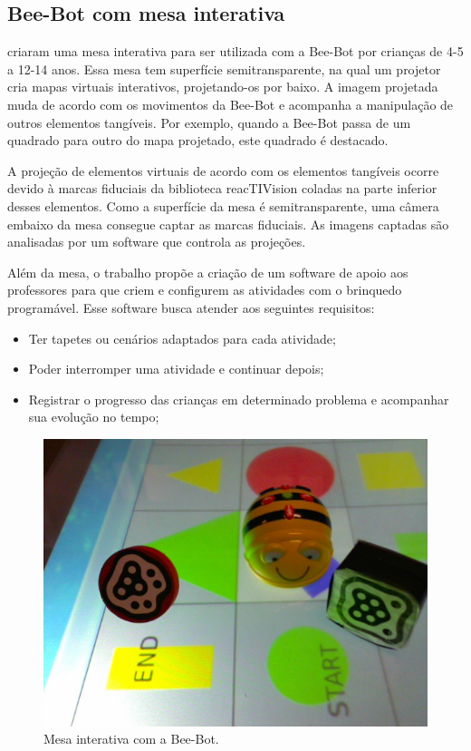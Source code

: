 \subsection{Bee-Bot com mesa interativa}
 criaram uma mesa interativa para ser utilizada com a Bee-Bot por crianças de 4-5 a 12-14 anos. Essa mesa tem superfície semitransparente, na qual um projetor cria mapas virtuais interativos, projetando-os por baixo. A imagem projetada muda de acordo com os movimentos da Bee-Bot e acompanha a manipulação de outros elementos tangíveis. Por exemplo, quando a Bee-Bot passa de um quadrado para outro do mapa projetado, este quadrado é destacado.

A projeção de elementos virtuais de acordo com os elementos tangíveis ocorre devido à marcas fiduciais da biblioteca reacTIVision coladas na parte inferior desses elementos. Como a superfície da mesa é semitransparente, uma câmera embaixo da mesa consegue captar as marcas fiduciais. As imagens captadas são analisadas por um software que controla as projeções.

Além da mesa, o trabalho propõe a criação de um software de apoio aos professores para que criem e configurem as atividades com o brinquedo programável. Esse software busca atender aos seguintes requisitos:

\begin{itemize}
    \item Ter tapetes ou cenários adaptados para cada atividade;
    \item Poder interromper uma atividade e continuar depois;
    \item Registrar o progresso das crianças em determinado problema e acompanhar sua evolução no tempo;
\end{itemize}

\begin{figure}[!htbp]
    \centering
    \includegraphics[width=.7\linewidth,fbox]{figs/beraza_bee_bot.png}
    \caption{Mesa interativa com a Bee-Bot.}
    \label{fig:beraza}
\end{figure}

